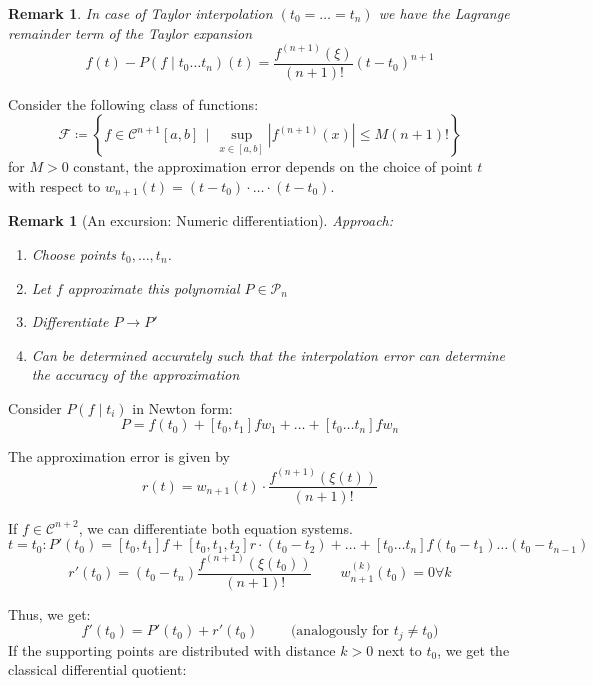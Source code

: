 \documentclass[a4paper]{article}
\newcounter{lecref}[section]
\numberwithin{lecref}{section}
\theoremstyle{break}
\newtheorem{remark}[lecref]{Remark}
\newcommand{\Abs}[1]{\left|#1\right|}
\newcommand{\SetDef}[2]{\left\{#1\,\mid\,#2\right\}}
\begin{document}
\begin{remark}
  \label{remark:4-14}
  In case of Taylor interpolation $(t_0 = \dots = t_n)$ we have the Lagrange remainder term of the Taylor expansion
  \[ f(t) - P(f \mid t_0 \dots t_n)(t) = \frac{f^{(n+1)}(\xi)}{(n+1)!} (t - t_0)^{n+1} \]
\end{remark}

Consider the following class of functions:
\[ \mathcal F \coloneqq \SetDef{f \in \mathcal C^{n+1}[a,b]}{\sup_{x \in [a,b]} \Abs{f^{(n+1)}(x)} \leq M(n+1)!} \]
for $M > 0$ constant, the approximation error depends on the choice of point $t$ with respect to $w_{n+1}(t) = (t - t_0) \cdot \dots \cdot (t - t_0)$.

\begin{remark}[An excursion: Numeric differentiation]
  Approach:
  \begin{enumerate}
    \item Choose points $t_0, \dots, t_n$.
    \item Let $f$ approximate this polynomial $P \in \mathcal P_n$
    \item Differentiate $P \to P'$
    \item Can be determined accurately such that the interpolation error can determine the accuracy of the approximation
  \end{enumerate}
\end{remark}

Consider $P(f \mid t_i)$ in Newton form:
\[ P = f(t_0) + [t_0, t_1] f w_1 + \dots + [t_0  \dots t_n] f w_n \]

The approximation error is given by
\[ r(t) = w_{n+1}(t) \cdot \frac{f^{(n+1)}(\xi(t))}{(n+1)!} \]

If $f \in \mathcal C^{n+2}$, we can differentiate both equation systems.
\[ t = t_0: P'(t_0) = [t_0, t_1] f + [t_0, t_1, t_2] r \cdot (t_0 - t_2) + \dots + [t_0 \dots t_n] f (t_0 - t_1) \dots (t_0 - t_{n-1}) \]
\[ r'(t_0) = (t_0 - t_n) \frac{f^{(n+1)}(\xi(t_0))}{(n+1)!} \qquad w_{n+1}^{(k)}(t_0) = 0 \forall k \]

Thus, we get:
\[ f'(t_0) = P'(t_0) + r'(t_0) \qquad \text{ (analogously for $t_j \neq t_0$)} \]
If the supporting points are distributed with distance $k > 0$ next to $t_0$, we get the classical differential quotient:
\end{document}
